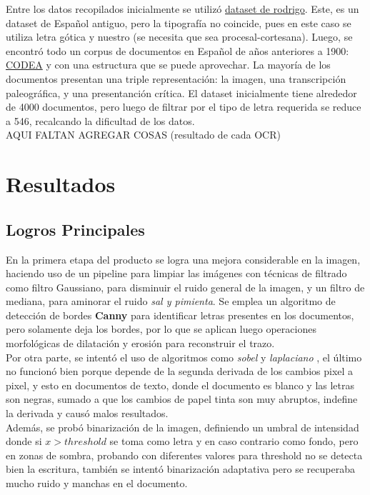 \documentclass[11pt,a4paper]{article}
\begin{document}
Entre los datos recopilados inicialmente se utiliz\'o \href{https://zenodo.org/records/1490009/files/Rodrigo%20corpus%201.0.0.tar.gz?download=1}{dataset de rodrigo}. Este, es un dataset de Español antiguo, pero la tipograf\'ia no coincide, pues en este caso se utiliza letra g\'otica y nuestro (se necesita que sea procesal-cortesana). Luego, se encontr\'o todo un corpus de documentos en Español de años anteriores a 1900: \href{https://corpuscodea.es/}{CODEA} y con una estructura que se puede aprovechar. La mayor\'ia de los documentos presentan una triple representaci\'on: la imagen, una transcripción paleogr\'afica, y una presentanci\'on cr\'itica. El dataset inicialmente tiene alrededor de 4000 documentos, pero luego de filtrar por el tipo de letra requerida se reduce a 546, recalcando la dificultad de los datos.\\

AQUI FALTAN AGREGAR COSAS (resultado de cada OCR)\\

\section{Resultados} 
\subsection{Logros Principales} 

En la primera etapa del producto se logra una mejora considerable en la imagen, haciendo uso de un pipeline para limpiar las im\'agenes con t\'ecnicas de filtrado como filtro Gaussiano, para disminuir el ruido general de la imagen, y un filtro de mediana, para aminorar el ruido \textit{sal y pimienta}. Se emplea un algoritmo de detecci\'on de bordes \textbf{Canny} para identificar letras presentes en los documentos, pero solamente deja los bordes, por lo que se aplican luego operaciones morfol\'ogicas de dilataci\'on y erosi\'on para reconstruir el trazo.\\

Por otra parte, se intentó el uso de algoritmos como \textit{sobel} y \textit{laplaciano} , el \'ultimo no funcionó bien porque depende de la segunda derivada de los cambios pixel a pixel, y esto en documentos de texto, donde el documento es blanco y las letras son negras, sumado a que los cambios de papel tinta son muy abruptos, indefine la derivada y causó malos resultados. \\

Adem\'as, se probó binarizaci\'on de la imagen, definiendo un umbral de intensidad donde si $x > threshold$ se toma como letra y en caso contrario como fondo, pero en zonas de sombra, probando con diferentes valores para threshold no se detecta bien la escritura, tambi\'en se intentó binarizaci\'on adaptativa pero se recuperaba mucho ruido y manchas en el documento.\\
\end{document}
